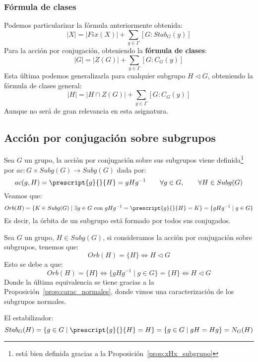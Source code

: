 \subsubsection{Fórmula de clases}
\noindent
Podemos particularizar la fórmula anteriormente obtenida:
\begin{equation*}
    |X| = |Fix(X)| + \sum_{y\in \Gamma} [G:Stab_G(y)]
\end{equation*}
Para la acción por conjugación, obteniendo la \textbf{fórmula de clases}:
\begin{equation*}
    |G| = |Z(G)| + \sum_{y\in \Gamma} [G:C_G(y)]
\end{equation*}
Esta última podemos generalizarla para cualquier subgrupo $H\lhd G$, obteniendo la fórmula de clases general:
\begin{equation*}
    |H| = |H\cap Z(G)| + \sum_{y\in \Gamma} [G:C_G(y)]
\end{equation*}
Aunque no será de gran relevancia en esta asignatura.

\subsection{Acción por conjugación sobre subgrupos}
\noindent
Sea $G$ un grupo, la acción por conjugación sobre sus subgrupos viene definida\footnote{está bien definida gracias a la Proposición~\ref{prop:xHx_subgrupo}} por $ac:G\times Subg(G)\to Subg(G)$ dada por:
\begin{equation*}
    ac(g,H) = \prescript{g}{}{H} = gHg^{-1} \qquad \forall g\in G, \qquad \forall H\in Subg(G)
\end{equation*}
Veamos que:
\begin{equation*}
    Orb(H) = \{K\in Subg(G) \mid \exists g\in G \text{\ con\ } gHg^{-1} = \prescript{g}{}{H} = K \} = \{gHg^{-1} \mid g\in G\}
\end{equation*}
Es decir, la órbita de un subgrupo está formado por todos sus conjugados.

\begin{observacion}
    Sea $G$ un grupo, $H\in Subg(G)$, si consideramos la acción por conjugación sobre subgrupos, tenemos que:
    \begin{equation*}
        Orb(H) = \{H\} \Longleftrightarrow H\lhd G
    \end{equation*}
    Esto se debe a que:
    \begin{equation*}
        Orb(H) = \{H\} \Longleftrightarrow \{gHg^{-1}\mid g\in G\} = \{H\} \Longleftrightarrow H \lhd G
    \end{equation*}
    Donde la última equivalencia se tiene gracias a la Proposición~\ref{prop:carac_normales}, donde vimos una caracterización de los subgrupos normales.
\end{observacion}
El estabilizador:
\begin{equation*}
    Stab_G(H) = \{g\in G \mid \prescript{g}{}{H} = H\} = \{g\in G \mid gH = Hg\} = N_G(H)
\end{equation*}

